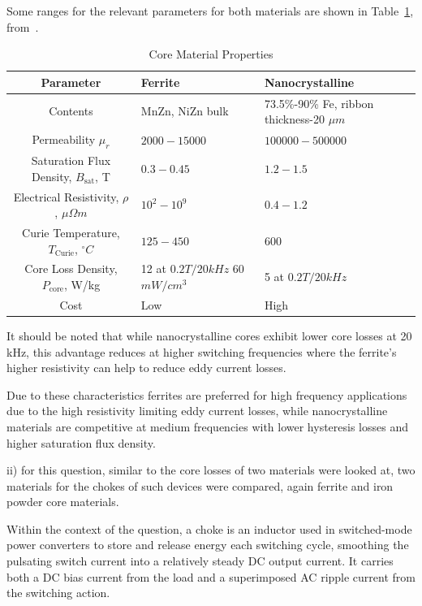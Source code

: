 \documentclass[a4paper, 12pt, titlepage]{report}
\begin{document}
Some ranges for the relevant parameters for both materials are shown in Table~\ref{tab:core_materials}, from~\cite{week4Lecture}.

\begin{table}[h]
    \centering
    \caption{Core Material Properties}
    \label{tab:core_materials}
    \begin{tabular}{|c|p{4cm}|p{4cm}|}
        \hline
        \textbf{Parameter} & \textbf{Ferrite} & \textbf{Nanocrystalline} \\
        \hline
        Contents & MnZn, NiZn bulk & 73.5\%-90\% Fe, ribbon thickness-20 \(\mu m\)  \\
        Permeability \(\mu_r\) & \(2000 - 15000\) & \(100000 - 500000\) \\
        Saturation Flux Density, \(B_{\mathrm{sat}}\), T & \(0.3 - 0.45\) & \(1.2 - 1.5\) \\
        Electrical Resistivity, \(\rho\), \(\mu \Omega m\) & \(10^2 - 10^9\) & \(0.4 - 1.2\) \\
        Curie Temperature, \(T_{\mathrm{Curie}}\), \(^\circ C\) & \(125 - 450\) & \(600\) \\
        Core Loss Density, \(P_{\mathrm{core}}\), W/kg & 12 at \(0.2 T/20 kHz \) 60 \(mW/cm^3\) & 5 at \(0.2 T /20kHz\) \\
        Cost & Low & High \\
        \hline
    \end{tabular}
\end{table}

It should be noted that while nanocrystalline cores exhibit lower core losses at 20 kHz, this advantage reduces at higher switching frequencies where the ferrite's higher resistivity can help to reduce eddy current losses.

Due to these characteristics ferrites are preferred for high frequency applications due to the high resistivity limiting eddy current losses, while nanocrystalline materials are competitive at medium frequencies with lower hysteresis losses and higher saturation flux density. 

\vspace{0.5cm}
ii) for this question, similar to the core losses of two materials were looked at, two materials for the chokes of such devices were compared, again ferrite and iron powder core materials.

Within the context of the question, a choke is an inductor used in switched-mode power converters to store and release energy each switching cycle, smoothing the pulsating switch current into a relatively steady DC output current. It carries both a DC bias current from the load and a superimposed AC ripple current from the switching action.
\end{document}
